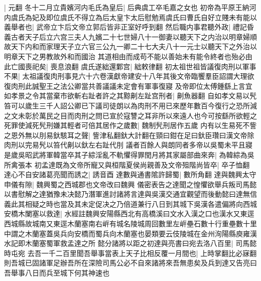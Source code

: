 |{
	元翻}
冬十二月立貴嬪河内毛氏為皇后|{
	后典虞工卒毛嘉之女也}
初帝為平原王納河内虞氏為妃及即位虞氏不得立為后太皇卞太后慰勉焉虞氏曰曹氏自好立賤未有能以義舉者也|{
	武帝立卞后文帝立郭后皆非正室好呼到翻}
然后職内事君聽外政|{
	禮記昏義古者天子后立六宫三夫人九嬪二十七世婦八十一御妻以聽天下之内治以明章婦順故天下内和而家理天子立六官三公九一卿二十七大夫八十一元士以聽天下之外治以明章天下之男教故外和而國治}
其道相由而成苟不能以善始未有能令終者也殆必由此亡國喪祀矣|{
	喪息浪翻}
虞氏遂絀還鄴宫|{
	絀敕律翻}
初太祖世祖皆議復肉刑以軍事不果|{
	太祖議復肉刑事見六十六卷漢獻帝建安十八年其後文帝臨饗羣臣詔謂大理欲復肉刑此誠聖王之法公卿當共善議議未定會有軍事復寢}
及帝即位太傅鍾繇上言宜如孝景之令其當棄市欲斬右趾者許之其黥劓左趾宫刑者|{
	劓魚器翻}
自如孝文易以髠笞可以歲生三千人詔公卿已下議司徒朗以為肉刑不用已來歷年數百今復行之恐所減之文未彰於萬民之目而肉刑之問已宣於寇讐之耳非所以來遠人也今可按繇所欲輕之死罪使減死髠刑嫌其輕者可倍其居作之歲數|{
	魏制髠刑居作五歲}
内有以生易死不訾之恩外無以刖易釱駭耳之聲|{
	訾津私翻釱大計翻在頸曰鉗在足曰釱臣瓚曰漢文帝除肉刑以完易髠以笞代劓以釱左右趾代刖}
議者百餘人與朗同者多帝以吳蜀未平且寢是歲吳昭武將軍韓當卒其子綜淫亂不軌懼得罪閏月將其家屬部曲來奔|{
	為韓綜為吳所禽張本}
初孟達既為文帝所寵又與桓階夏侯尚親善及文帝殂階尚皆卒|{
	卒子恤翻}
達心不自安諸葛亮聞而誘之|{
	誘音酉}
達數與通書隂許歸蜀|{
	數所角翻}
達與魏興太守申儀有隙|{
	魏興蜀之西城郡也文帝改曰魏興}
儀密表告之達聞之惶懼欲舉兵叛司馬懿以書慰解之達猶豫未决懿乃潛軍進討諸將言達與吳漢交通宜觀望而後動懿曰達無信義此其相疑之時也當及其未定促决之乃倍道兼行八日到其城下吳漢各遣偏將向西城安橋木闌塞以救達|{
	水經註魏興安陽縣西北有高橋溪曰文水入漢之口也漢水又東逕西城縣故城南又東逕木蘭塞南右㟁有城名陵城周回數里左㟁壘石數十行重壘數十里中謂之木蘭塞蓋吳兵向安橋而蜀兵向木蘭塞也晏類要云伎陵城在金州洵陽縣庾雍漢水記即木蘭塞蜀軍救孟達之所}
懿分諸將以距之初達與亮書曰宛去洛八百里|{
	司馬懿時屯宛}
去吾一千二百里聞吾舉事當表上天子比相反覆一月間也|{
	上時掌翻比必寐翻}
則吾城已固諸軍足辦吾所在深險司馬公必不自來諸將來吾無患矣及兵到達又告亮曰吾舉事八日而兵至城下何其神速也

